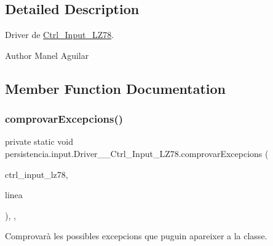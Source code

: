 \subsection{Detailed Description}
Driver de \hyperlink{classpersistencia_1_1input_1_1Ctrl__Input__LZ78}{Ctrl\+\_\+\+Input\+\_\+\+L\+Z78}. 

\begin{DoxyAuthor}{Author}
Manel Aguilar 
\end{DoxyAuthor}


\subsection{Member Function Documentation}
\mbox{\label{classpersistencia_1_1input_1_1Driver____Ctrl__Input__LZ78_a285493e74dff1f6b2520f010f75b850c}} 
\subsubsection{\texorpdfstring{comprovar\+Excepcions()}{comprovarExcepcions()}}
{\footnotesize\ttfamily private static void persistencia.\+input.\+Driver\+\_\+\+\_\+\+Ctrl\+\_\+\+Input\+\_\+\+L\+Z78.\+comprovar\+Excepcions (\begin{DoxyParamCaption}\item[{\hyperlink{classpersistencia_1_1input_1_1Ctrl__Input__LZ78}{Ctrl\+\_\+\+Input\+\_\+\+L\+Z78}}]{ctrl\+\_\+input\+\_\+lz78,  }\item[{String}]{linea }\end{DoxyParamCaption})\hspace{0.3cm}{\ttfamily [inline]}, {\ttfamily [static]}, {\ttfamily [private]}}



Comprovarà les possibles excepcions que puguin apareixer a la classe. 



